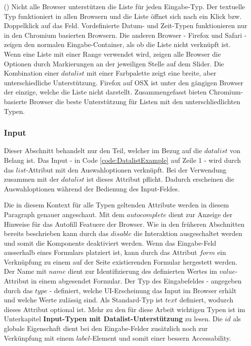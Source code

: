 (\cite{optionMdn}) Nicht alle Browser unterstützen die Liste für jeden Eingabe-Typ.
Der textuelle Typ funktioniert in allen Browsern und die Liste öffnet sich nach ein Klick bzw. Doppelklick auf das Feld.
Vordefinierte Datum- und Zeit-Typen funktionieren nur in den Chromium basierten Browsern. 
Die anderen Browser - Firefox und Safari - zeigen den normalen Eingabe-Container, als ob die Liste nicht verknüpft ist.
Wenn eine Liste mit einer Range verwendet wird, zeigen alle Browser die Optionen durch Markierungen an der jeweiligen Stelle auf dem Slider.
Die Kombination einer $datalist$ mit einer Farbpalette zeigt eine breite, aber unterschiedliche Unterstützung. 
Firefox auf OSX ist unter den gängigen Browser der einzige, welche die Liste nicht darstellt.
Zusammengefasst bieten Chromium-basierte Browser die beste Unterstützung für Listen mit den unterschliedlichten Typen.


\subsubsection{Input}

Dieser Abschnitt behandelt nur den Teil, welcher im Bezug auf die $datalist$ von Belang ist.
Das Input - in Code \ref{code:DatalistExample} auf Zeile 1 - wird durch das $list$-Attribut mit den Auswahloptionen verknüpft.
Bei der Verwendung zusammen mit der $datalist$ ist dieses Attribut pflicht.
Dadurch erscheinen die Auswahloptionen während der Bedienung des Input-Feldes. 

Die in diesem Kontext für alle Typen geltenden Attribute werden in diesem Paragraph genauer angeschaut.
Mit dem $autocomplete$ dient zur Anzeige der Hinweise für das Autofill Featuere der Browser.
Wie in den früheren Abschnitten bereits beschrieben kann durch das $disable$ die Interaktion ausgeschaltet werden und somit die Komponente deaktiviert werden.
Wenn das Eingabe-Feld ausserhalb eines Formulars platziert ist, kann durch das Attribut $form$ ein Verknüpfung zu einem auf der Seite existierenden Formular hergestett werden.
Der Name mit $name$ dient zur Identifizierung des definierten Wertes im $value$-Attribut in einem abgesendet Formular.
Der Typ des Eingabefeldes - angegeben durch das $type$ - definiert, welche UI-Erscheinung das Input im Browser erhält und welche Werte zulässig sind.
Als Standard-Typ ist $text$ definiert, wodurch dieses Attribut optional ist.
Mehr zu den für diese Arbeit wichtigen Typen ist im Unterkapitel \textbf{Input-Typen mit Datalist-Unterstützung} zu lesen.
Die $id$ als globale Eigenschaft dient bei den Eingabe-Felder zusätzlich noch zur Verkünpfung mit einem $label$-Element und somit einer bessern Accessability.

